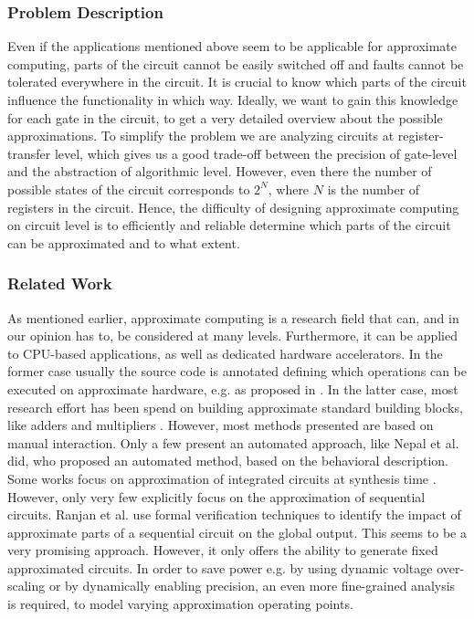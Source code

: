\documentclass[conference]{IEEEtran}
\begin{document}
\subsubsection*{Problem Description}
Even if the applications mentioned above seem to be applicable for approximate computing, parts of the circuit cannot be easily switched off and faults cannot be tolerated everywhere in the circuit. It is crucial to know which parts of the circuit influence the functionality in which way. Ideally, we want to gain this knowledge for each gate in the circuit, to get a very detailed overview about the possible approximations. To simplify the problem we are analyzing circuits at register-transfer level, which gives us a good trade-off between the precision of gate-level and the abstraction of algorithmic level. However, even there the number of possible states of the circuit corresponds to $2^N$, where $N$ is the number of registers in the circuit. Hence, the difficulty of designing approximate computing on circuit level is to efficiently and reliable determine which parts of the circuit can be approximated and to what extent.
\subsubsection*{Related Work}
As mentioned earlier, approximate computing is a research field that can, and in our opinion has to, be considered at many levels. Furthermore, it can be applied to CPU-based applications, as well as dedicated hardware accelerators. In the former case usually the source code is annotated defining which operations can be executed on approximate hardware, e.g. as proposed in \cite{sampson_enerj:_2011}. In the latter case, most research effort has been spend on building approximate standard building blocks, like adders and multipliers \cite{huang_exploring_2011,chakrapani_highly_2008,gupta_impact:_2011,kahng_accuracy-configurable_2012}. However, most methods presented are based on manual interaction. Only a few present an automated approach, like Nepal et al. \cite{nepal_abacus:_2014} did, who proposed an automated method, based on the behavioral description. Some works focus on approximation of integrated circuits at synthesis time \cite{miao_approximate_2013,shin_approximate_2010,choudhury_approximate_2008}. However, only very few explicitly focus on the approximation of sequential circuits. Ranjan et al. \cite{ranjan_aslan:_2014} use formal verification techniques to identify the impact of approximate parts of a sequential circuit on the global output. This seems to be a very promising approach. However, it only offers the ability to generate fixed approximated circuits. In order to save power e.g. by using dynamic voltage over-scaling or by dynamically enabling precision, an even more fine-grained analysis is required, to model varying approximation operating points.
\end{document}
